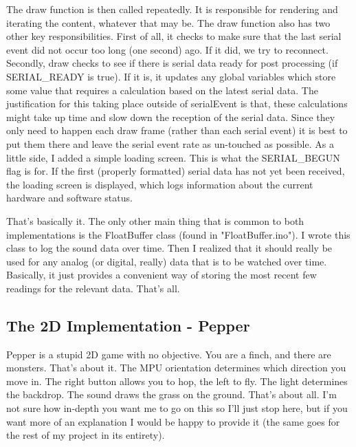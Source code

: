 \documentclass[paper=a4, fontsize=12pt]{scrartcl} 	%
\newcommand{\mm}[1]{\fontfamily{\ttdefault}\selectfont#1\fontfamily{\rmdefault}\selectfont}
\begin{document}
	The \mm{draw} function is then called repeatedly.  It is responsible for rendering and iterating the content, whatever that may be.  The \mm{draw} function also has two other key responsibilities.  First of all, it checks to make sure that the last serial event did not occur too long (one second) ago.  If it did, we try to reconnect.  Secondly, \mm{draw} checks to see if there is serial data ready for post processing (if \mm{SERIAL\_READY} is true).  If it is, it updates any global variables which store some value that requires a calculation based on the latest serial data.  The justification for this taking place outside of \mm{serialEvent} is that, these calculations might take up time and slow down the reception of the serial data.  Since they only need to happen each draw frame (rather than each serial event) it is best to put them there and leave the serial event rate as un-touched as possible.  As a little side, I added a simple loading screen.  This is what the \mm{SERIAL\_BEGUN} flag is for.  If the first (properly formatted) serial data has not yet been received, the loading screen is displayed, which logs information about the current hardware and software status.
	
	That's basically it.  The only other main thing that is common to both implementations is the \mm{FloatBuffer} class (found in "FloatBuffer.ino").  I wrote this class to log the sound data over time.  Then I realized that it should really be used for any analog (or digital, really) data that is to be watched over time.  Basically, it just provides a convenient way of storing the most recent few readings for the relevant data.  That's all.


\subsection{The 2D Implementation - Pepper}
	Pepper is a stupid 2D game with no objective.  You are a finch, and there are monsters.  That's about it.  The MPU orientation determines which direction you move in.  The right button allows you to hop, the left to fly.  The light determines the backdrop.  The sound draws the grass on the ground.  That's about all.  I'm not sure how in-depth you want me to go on this so I'll just stop here, but if you want more of an explanation I would be happy to provide it (the same goes for the rest of my project in its entirety).
\end{document}
